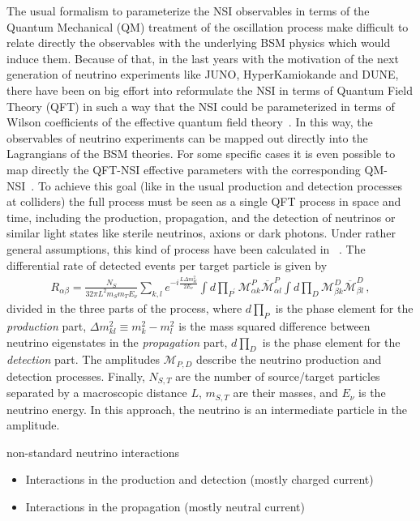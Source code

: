 \documentclass[a4paper,10pt,epsfig,epsf,amsfonts,amsmath]{article}
\begin{document}
The usual formalism to parameterize the NSI observables in terms of the Quantum Mechanical (QM) treatment of the oscillation process make difficult to relate directly the observables with the underlying BSM physics which would induce them. Because of that, in the last years
with the motivation of the next generation of neutrino experiments like JUNO, HyperKamiokande and DUNE, 
there have been on big effort into reformulate the NSI in terms of Quantum Field Theory (QFT) in such a way that the NSI could be parameterized in terms of Wilson
coefficients of the effective quantum field theory~\cite{}. In this way, the observables of neutrino experiments can be mapped out directly into the Lagrangians of the BSM theories.
For some specific cases it is even possible to map directly the QFT-NSI effective parameters with the corresponding QM-NSI~\cite{1910.02971}. 
To achieve this goal (like in the usual production and detection processes at colliders) the full process must be seen as a single QFT process in space and time, including the production, propagation, and the detection of neutrinos or similar light states like sterile neutrinos, axions or dark photons. Under rather general assumptions, this kind of process have been calculated in ~\cite{1910.02971}. The 
differential rate of detected events per target particle is given by
\begin{align}
R_{\alpha \beta}=\frac{N_{S}}{32 \pi L^{2} m_{S} m_{T} E_{\nu}} \sum_{k, l} e^{-i \frac{L \Delta m_{k l}^{2}}{2 E_{\nu}}} \int d \prod_{P^{\prime}} \mathcal{M}_{\alpha k}^{P} \overline{\mathcal{M}}_{\alpha l}^{P} \int d \prod_{D} \mathcal{M}_{\beta k}^{D} \overline{\mathcal{M}}_{\beta l}^{D}\,,
\end{align}
divided in the three parts of the process,
where $d\prod_{P} $ is the phase element for the \emph{production} part,  $\Delta m_{k l}^{2} \equiv m_{k}^{2}-m_{l}^{2}$ is the mass squared difference between neutrino eigenstates in the \emph{propagation} part, $d\prod_{D} $ is the phase element for the \emph{detection} part. The amplitudes $\mathcal{M}_{P,D}$ describe the neutrino production and detection processes. Finally, $N_{S,T}$ are the number of source/target particles separated by a macroscopic distance $L$, $m_{S,T}$ are their masses, and $E_\nu$ is the neutrino energy. In this approach, the
neutrino is an intermediate particle in the amplitude.

non-standard neutrino interactions
\begin{itemize}
    \item Interactions in the production and detection (mostly charged current)
    \item Interactions in the propagation (mostly neutral current)
\end{itemize}
\end{document}
